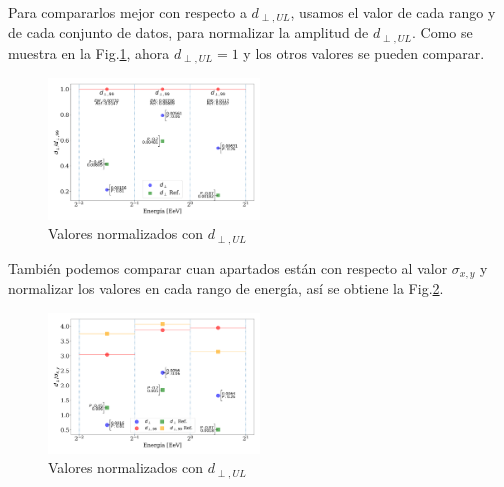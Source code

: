     Para compararlos mejor con respecto a $d_{\perp,UL}$, usamos el valor de cada rango y de cada conjunto de datos, para normalizar la amplitud de $d_{\perp,UL}$. Como se muestra en la Fig.\ref{fig:normalizado}, ahora $d_{\perp,UL}=1$ y los otros valores se pueden comparar. 

    \begin{figure}[H]
        \begin{small}
            \begin{center}
                \includegraphics[width=0.5\textwidth]{d_perp_normalizado.pdf}
            \end{center}
            \caption{Valores normalizados con $d_{\perp,UL}$}
            \label{fig:normalizado}
        \end{small}
    \end{figure}

    También podemos comparar cuan apartados están con respecto al valor $\sigma_{x,y}$ y normalizar los valores en cada rango de energía, así se obtiene la Fig.\ref{fig:normalizado_sigma}.

    \begin{figure}[H]
        \begin{small}
            \begin{center}
                \includegraphics[width=0.5\textwidth]{d_perp_normalizado_sigmas_v4.pdf}
            \end{center}
            \caption{Valores normalizados con $d_{\perp,UL}$}
            \label{fig:normalizado_sigma}
        \end{small}
    \end{figure}

